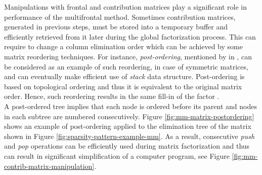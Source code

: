 Manipulations with frontal and contribution matrices play a significant role in performance of the multifrontal method. Sometimes contribution matrices, generated in previous steps, must be stored into a temporary buffer and efficiently retrieved from it later during the global factorization process. This can require to change a column elimination order which can be achieved by some matrix reordering techniques. For instance, \textit{post-ordering}, mentioned by \citeauthor{mult-frontal-original:2} in \cite{mult-frontal-original:2}, can be considered as an example of such reordering, in case of symmetric matrices, and can eventually make efficient use of \textit{stack} data structure. Post-ordering is based on topological ordering and thus it is equivalent to the original matrix order. Hence,  such reordering results in the same fill-in of the factor \cite{mult-frontal-original:2}.\\








A post-ordered tree implies that each node is ordered before its parent and nodes in each subtree are numbered consecutively. Figure \ref{fig:mm-matrix-postordering} shows an example of post-ordering applied to the elimination tree of the matrix shown in Figure \ref{fig:sparsity-pattern-example-mm}. As a result, consecutive \textit{push} and \textit{pop} operations can be efficiently used during matrix factorization and thus can result in significant simplification of a computer program, see Figure \ref{fig:mm-contrib-matrix-manipulation}.



